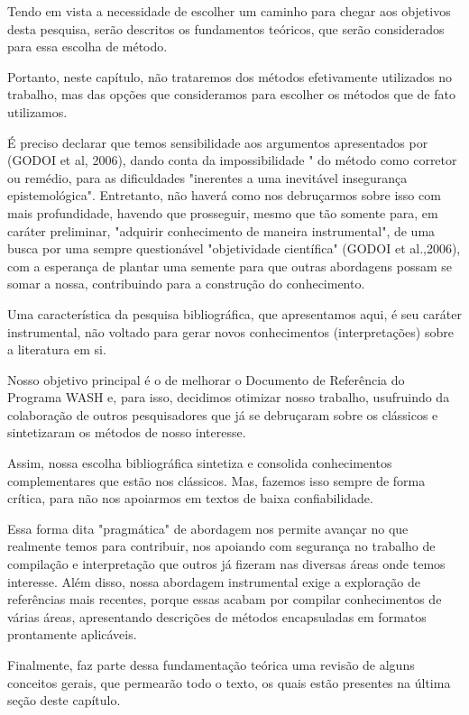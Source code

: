 Tendo em vista a necessidade de escolher um caminho para chegar  aos objetivos desta pesquisa, serão descritos os fundamentos teóricos, que serão considerados para essa escolha de método.

Portanto, neste capítulo, não trataremos dos métodos efetivamente utilizados no trabalho, mas das opções que consideramos para escolher os métodos que de fato utilizamos.

É preciso declarar que temos sensibilidade aos argumentos apresentados por (GODOI et al, 2006), dando conta da impossibilidade " do método como corretor ou remédio, para as dificuldades "inerentes a uma inevitável insegurança epistemológica". Entretanto, não haverá como nos debruçarmos sobre isso com mais profundidade, havendo que prosseguir, mesmo que tão somente para, em caráter preliminar, "adquirir conhecimento de maneira instrumental", de uma busca por uma sempre questionável "objetividade científica" (GODOI et al.,2006), com a esperança de plantar uma semente para que outras abordagens possam se somar a nossa, contribuindo para a construção do conhecimento.

Uma característica da pesquisa bibliográfica, que apresentamos aqui, é seu  caráter instrumental, não voltado para gerar novos conhecimentos (interpretações) sobre a literatura em si.

Nosso objetivo principal é o de melhorar o Documento de Referência do Programa WASH e, para isso, decidimos otimizar nosso trabalho, usufruindo da colaboração de outros pesquisadores que já se debruçaram sobre os clássicos e  sintetizaram os métodos de nosso interesse.

Assim, nossa escolha bibliográfica sintetiza e consolida conhecimentos complementares que estão nos clássicos. Mas, fazemos isso sempre de forma crítica, para não nos apoiarmos em textos de baixa confiabilidade.

Essa forma dita "pragmática" de abordagem nos permite avançar no que realmente temos para contribuir, nos apoiando com segurança no trabalho de compilação e interpretação que outros já fizeram nas diversas áreas onde temos interesse. Além disso, nossa abordagem instrumental exige a exploração de referências mais recentes, porque essas acabam por compilar conhecimentos de várias áreas, apresentando descrições de métodos encapsuladas em formatos prontamente aplicáveis.

Finalmente, faz parte dessa fundamentação teórica uma revisão de alguns conceitos gerais, que permearão todo o texto, os quais estão presentes na última seção deste capítulo.

